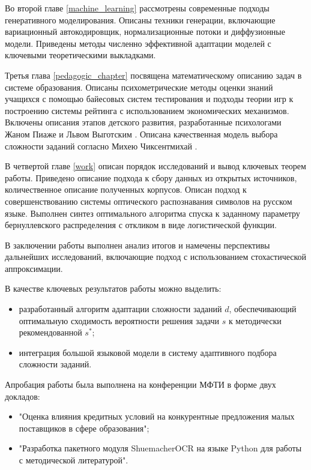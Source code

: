 Во второй главе \ref{machine_learning} рассмотрены современные подходы генеративного моделирования. Описаны техники 
генерации, включающие вариационный автокодировщик, нормализационные потоки и диффузионные модели. Приведены 
методы численно эффективной адаптации моделей  с ключевыми теоретическими выкладками.

Третья глава \ref{pedagogic_chapter} посвящена математическому описанию задач в системе образования. Описаны психометрические методы 
оценки знаний учащихся с помощью байесовых систем тестирования и подходы теории игр к построению системы рейтинга 
с использованием экономических механизмов. Включены описания этапов детского развития, разработанные психологами Жаном Пиаже \cite{piaget1952origins} и Львом Выготским \cite{выготский2014мышление}.
Описана качественная модель выбора сложности заданий согласно Михею Чиксентмихай \cite{chen2007flow}.

В четвертой главе \ref{work} описан порядок исследований и вывод ключевых теорем работы. Приведено описание подхода к сбору данных из открытых источников, количественное
описание полученных корпусов. Описан подход к совершенствованию системы оптического распознавания символов на русском языке. Выполнен синтез 
оптимального алгоритма спуска к заданному параметру бернуллевского распределения с откликом в виде логистической функции. 

В заключении работы выполнен анализ итогов и намечены перспективы дальнейших исследований, включающие подход с использованием
 стохастической аппроксимации.

В качестве ключевых результатов работы можно выделить: \begin{itemize}
    \item разработанный алгоритм адаптации сложности заданий $d$, обеспечивающий оптимальную сходимость вероятности решения задачи $s$ к методически рекомендованной $s^*$;
    \item интеграция большой языковой модели в систему адаптивного подбора сложности заданий.
\end{itemize}

Апробация работы была выполнена на конференции МФТИ в форме двух докладов: \begin{itemize}
    \item "Оценка влияния кредитных условий на конкурентные предложения малых поставщиков в сфере образования";
    \item "Разработка пакетного модуля ShuemacherOCR на языке Python для работы с методической литературой".
\end{itemize}
